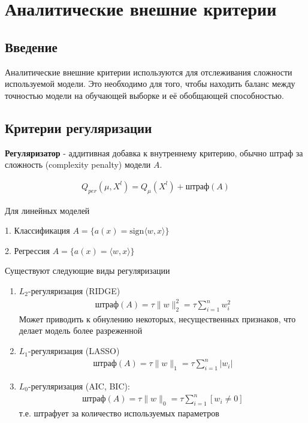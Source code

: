 \section{Аналитические внешние критерии}

\subsection{Введение}

\par Аналитические внешние критерии используются для отслеживания сложности используемой модели. Это необходимо для того, чтобы находить баланс между точностью модели на обучающей выборке и её обобщающей способностью.

\subsection{Критерии регуляризации}

\par \textbf{Регуляризатор} - аддитивная добавка к внутреннему критерию, обычно штраф за сложность (complexity penalty) модели $A$. 

\begin{align*}
    Q_{per} (\mu, X^l) = Q_{\mu}(X^l) + \text{штраф}(A)
\end{align*}


\par Для линейных моделей

1. Классификация $A = \{a(x) = \text{sign}\langle w, x \rangle\}$

2. Регрессия $A = \{a(x) = \langle w, x \rangle \}$

\par Существуют следующие виды регуляризации

\begin{enumerate}
    \item $L_2$-регуляризация (RIDGE)
        \begin{align*}
            \text{штраф}(A) =  \tau \|w\|_2^2 = \tau \sum\limits_{i = 1}^n w_i^2
        \end{align*}
        Может приводить к обнулению некоторых, несущественных признаков, что делает модель более разреженной
    \item $L_1$-регуляризация (LASSO)
        \begin{align*}
            \text{штраф}(A) = \tau \|w\|_1 = \tau \sum\limits_{i = 1}^n |w_i|
        \end{align*}
    \item $L_0$-регуляризация (AIC, BIC):
        \begin{align*}
            \text{штраф}(A) = \tau\|w\|_0 = \tau\sum\limits_{i = 1}^n [w_i \neq 0]
        \end{align*}
        т.е. штрафует за количество используемых параметров
\end{enumerate}


